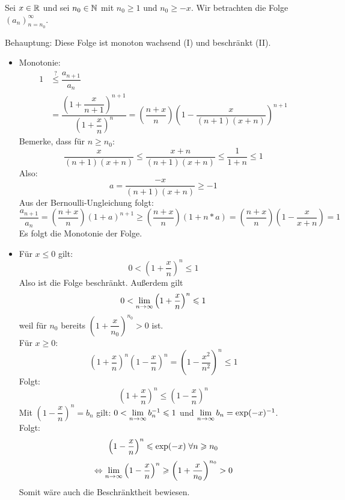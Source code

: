 \documentclass[main.tex]{subfiles}
\begin{document}
\begin{Beweis}
  Sei $x \in \mathbb{R}$ und sei $n_0 \in \mathbb{N}$ mit $n_0 \geq 1$ und $n_0 \geq -x$. Wir betrachten die Folge
  $(a_n)_{n=n_0}^\infty$.

  Behauptung: Diese Folge ist monoton wachsend (I) und beschränkt (II).
  \begin{itemize}
    \item Monotonie:
    $$\begin{aligned}
      1 & \stackrel{?}{\leq} \dfrac{a_{n+1}}{a_n} \\
      & = \dfrac{\left(1+\dfrac{x}{n+1}\right)^{n+1}}{\left(1+\dfrac{x}{n}\right)^{n}} = \left(\dfrac{n+x}{n}\right) \left(1-\dfrac{x}{(n+1)(x+n)}\right)^{n+1}
    \end{aligned}$$
    Bemerke, dass für $n \geq n_0$:
    $$\dfrac{x}{(n+1)(x+n)} \leq \dfrac{x+n}{(n+1)(x+n)} \leq \dfrac{1}{1+n} \leq 1$$
    Also:
    $$a = \dfrac{-x}{(n+1)(x+n)} \geq -1$$
    Aus der Bernoulli-Ungleichung folgt:
    $$\dfrac{a_{n+1}}{a_n} = \left(\dfrac{n+x}{n}\right)(1+a)^{n+1} \geq \left(\dfrac{n+x}{n}\right)(1+n*a) = \left(\dfrac{n+x}{n}\right)\left(1 - \dfrac{x}{x+n}\right) = 1$$
    Es folgt die Monotonie der Folge.
    \item Für $x \leq 0$ gilt:
    $$0 < \left(1 + \dfrac{x}{n}\right)^n \leq 1$$
    Also ist die Folge beschränkt. Außerdem gilt
    $$0 < \lim \limits_{n \to \infty} \left(1 + \dfrac{x}{n}\right)^n \leqslant 1$$
    weil für $n_0$ bereits $\left(1 + \dfrac{x}{n_0}\right)^{n_0} > 0$ ist.\\
    Für $x \geq 0$:
    $$\left(1 + \dfrac{x}{n}\right)^n \left(1 - \dfrac{x}{n}\right)^n = \left(1 - \dfrac{x^2}{n^2}\right)^n \leq 1$$
    Folgt:
    $$\left(1 + \dfrac{x}{n}\right)^n \leq \left(1 - \dfrac{x}{n}\right)^n$$
    Mit $\left(1 - \dfrac{x}{n}\right)^n = b_n$ gilt: $0 < \lim \limits_{n \to \infty} b_n^{-1} \leqslant 1$ und $\lim \limits_{n \to \infty} b_n = \exp(-x)^{-1}$.\\
    Folgt:
    $$\left(1 - \dfrac{x}{n}\right)^n \leqslant \exp(-x) \;\forall n\geqslant n_0$$
    $$\Leftrightarrow \lim \limits_{n \to \infty} \left(1 - \dfrac{x}{n}\right)^n \geqslant \left(1 + \dfrac{x}{n_0}\right)^{n_0} > 0$$
    Somit wäre auch die Beschränktheit bewiesen.
  \end{itemize}
\end{Beweis}
\end{document}
